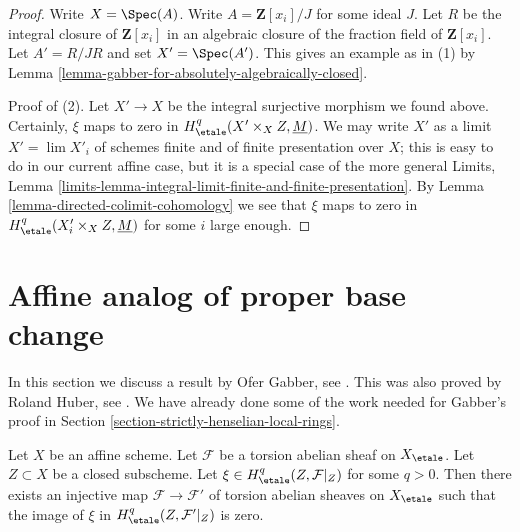 \begin{proof}
Write $X = \Spec(A)$. Write $A = \mathbf{Z}[x_i]/J$ for some ideal $J$.
Let $R$ be the integral closure of $\mathbf{Z}[x_i]$ in an algebraic
closure of the fraction field of $\mathbf{Z}[x_i]$. Let
$A' = R/JR$ and set $X' = \Spec(A')$. This gives an example as in (1) by
Lemma \ref{lemma-gabber-for-absolutely-algebraically-closed}.

\medskip\noindent
Proof of (2). Let $X' \to X$ be the integral surjective morphism we found
above. Certainly, $\xi$ maps to zero in
$H^q_\etale(X' \times_X Z, \underline{M})$. We may write $X'$ as a
limit $X' = \lim X'_i$ of schemes finite and of finite presentation
over $X$; this is easy to do in our current affine case, but it
is a special case of the more general Limits, Lemma
\ref{limits-lemma-integral-limit-finite-and-finite-presentation}.
By Lemma \ref{lemma-directed-colimit-cohomology}
we see that $\xi$ maps to zero in $H^q_\etale(X'_i \times_X Z, \underline{M})$
for some $i$ large enough.
\end{proof}










\section{Affine analog of proper base change}
\label{section-gabber-affine-proper}

\noindent
In this section we discuss a result by Ofer Gabber, see
\cite{gabber-affine-proper}. This was also proved by Roland Huber, see
\cite{Huber-henselian}. We have already done some of the work needed
for Gabber's proof in Section \ref{section-strictly-henselian-local-rings}.

\begin{lemma}
\label{lemma-efface-cohomology-on-closed-by-finite-cover}
Let $X$ be an affine scheme. Let $\mathcal{F}$ be a torsion abelian sheaf
on  $X_\etale$. Let $Z \subset X$ be a closed subscheme. Let
$\xi \in H^q_\etale(Z, \mathcal{F}|_Z)$ for some $q > 0$.
Then there exists an injective map $\mathcal{F} \to \mathcal{F}'$
of torsion abelian sheaves on $X_\etale$ such that
the image of $\xi$ in $H^q_\etale(Z, \mathcal{F}'|_Z)$ is zero.
\end{lemma}

